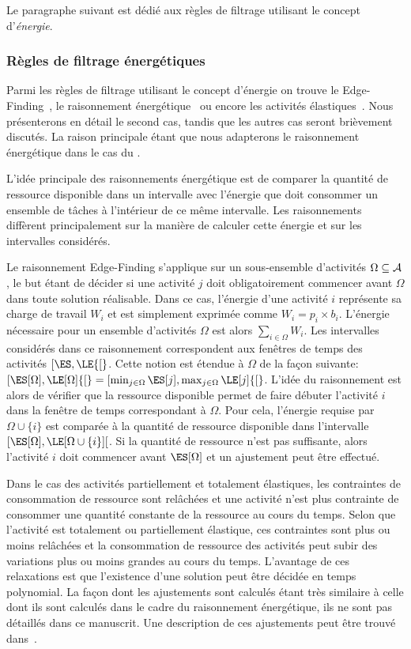 Le paragraphe suivant est dédié aux règles de filtrage utilisant le
concept d'{\it énergie}. 
 
\subsubsection{Règles de filtrage énergétiques}
 \label{sec:nrj_CUSP}
Parmi les règles de filtrage utilisant le concept d'énergie on trouve
le Edge-Finding~\cite{VilimEF,theseNuijten}, le raisonnement
énergétique~\cite{RELopez} ou encore les activités
élastiques~\cite{BLPN}.  Nous présenterons en détail le second cas,
tandis que les autres cas seront brièvement discutés. La raison
principale étant que nous adapterons le raisonnement énergétique dans
le cas du \CECSP.

L'idée principale des raisonnements énergétique est de comparer la
quantité de ressource disponible dans un intervalle avec l'énergie que
doit consommer un ensemble de tâches à l'intérieur de ce même
intervalle. Les raisonnements diffèrent principalement sur la manière
de calculer cette énergie et sur les intervalles considérés. 

 Le raisonnement Edge-Finding s'applique sur un sous-ensemble
d'activités $\Omega \subseteq {\cal A}$, le but étant de décider si une
activité $j$ doit obligatoirement commencer avant $\Omega$ dans toute
solution réalisable. Dans ce cas, l'énergie d'une activité $i$
représente sa charge de travail $W_i$ et est simplement exprimée comme
$W_i=p_i\times b_i$. L'énergie nécessaire pour un ensemble d'activités
$\Omega$ est alors $\sum_{i\in \Omega} W_i$. Les intervalles
considérés dans ce raisonnement correspondent aux fenêtres de temps
des activités $[\ES,\LE{[}$. Cette notion est étendue à $\Omega$ de la
façon suivante: $[\ES[\Omega],\LE[\Omega]{[}=[\min_{j \in
\Omega}\ES[j],\max_{j \in \Omega} \LE[j] {[}$. L'idée du raisonnement
est alors de vérifier que la ressource disponible permet de faire
débuter l'activité $i$ dans la fenêtre de temps correspondant à
$\Omega$. Pour cela, l'énergie requise par $\Omega \cup \{ i\}$ est
comparée à la quantité de ressource disponible dans l'intervalle
$[\ES[\Omega],\LE[\Omega\cup \{i\}]{[}$. Si la quantité de ressource
n'est pas suffisante, alors l'activité $i$ doit commencer avant
$\ES[\Omega]$ et un ajustement peut être effectué.

Dans le cas des activités partiellement et totalement élastiques, les
contraintes de consommation de ressource sont relâchées et une
activité n'est plus contrainte de consommer une quantité constante de
la ressource au cours du temps. Selon que l'activité est totalement
ou partiellement élastique, ces contraintes sont plus ou moins
relâchées et la consommation de ressource des activités peut subir des
variations plus ou moins grandes au cours du temps. L'avantage de ces
relaxations est que l'existence d'une solution peut être décidée en
temps polynomial. La façon dont les ajustements sont calculés étant
très similaire à celle dont ils sont calculés dans le cadre du
raisonnement énergétique, ils ne sont pas détaillés dans ce
manuscrit. Une description de ces ajustements peut être trouvé
dans~\cite{BLN}. 

